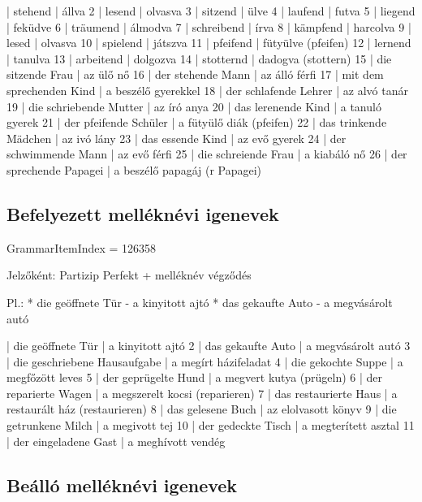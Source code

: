 \documentclass{article}
\newenvironment{desc}{\verbatim}{\endverbatim}
\newenvironment{exmp}{\verbatim}{\endverbatim}
\begin{document}
\begin{exmp}
1 | stehend | állva
2 | lesend | olvasva
3 | sitzend | ülve
4 | laufend | futva
5 | liegend | feküdve
6 | träumend | álmodva
7 | schreibend | írva
8 | kämpfend | harcolva
9 | lesed | olvasva
10 | spielend | játszva
11 | pfeifend | fütyülve (pfeifen)
12 | lernend | tanulva
13 | arbeitend | dolgozva
14 | stotternd | dadogva (stottern)
15 | die sitzende Frau | az ülő nő
16 | der stehende Mann | az álló férfi
17 | mit dem sprechenden Kind | a beszélő gyerekkel
18 | der schlafende Lehrer | az alvó tanár
19 | die schriebende Mutter | az író anya
20 | das lerenende Kind | a tanuló gyerek
21 | der pfeifende Schüler | a fütyülő diák (pfeifen)
22 | das trinkende Mädchen | az ivó lány
23 | das essende Kind | az evő gyerek
24 | der schwimmende Mann | az evő férfi
25 | die schreiende Frau | a kiabáló nő
26 | der sprechende Papagei | a beszélő papagáj (r Papagei)
\end{exmp}

\subsection{Befelyezett melléknévi igenevek}

GrammarItemIndex = 126358

\begin{desc}
Jelzőként: Partizip Perfekt + melléknév végződés

Pl.: * die geöffnete Tür - a kinyitott ajtó
* das gekaufte Auto - a megvásárolt autó
\end{desc}

\begin{exmp}
1 | die geöffnete Tür | a kinyitott ajtó
2 | das gekaufte Auto | a megvásárolt autó
3 | die geschriebene Hausaufgabe | a megírt házifeladat
4 | die gekochte Suppe | a megfőzött leves
5 | der geprügelte Hund | a megvert kutya (prügeln)
6 | der reparierte Wagen | a megszerelt kocsi (reparieren)
7 | das restaurierte Haus | a restaurált ház (restaurieren)
8 | das gelesene Buch | az elolvasott könyv
9 | die getrunkene Milch | a megivott tej
10 | der gedeckte Tisch | a megterített asztal
11 | der eingeladene Gast | a meghívott vendég
\end{exmp}

\subsection{Beálló melléknévi igenevek}
\end{document}
